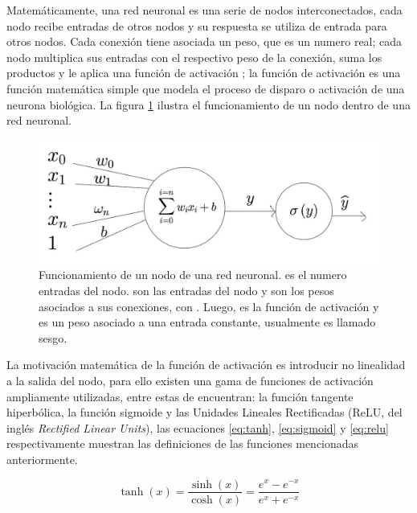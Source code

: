 Matemáticamente, una red neuronal es una serie de nodos interconectados, cada nodo recibe entradas de otros nodos y su respuesta se utiliza de entrada para otros nodos. Cada conexión tiene asociada un peso, que es un numero real; cada nodo multiplica sus entradas con el respectivo peso de la conexión, suma los productos y le aplica una función de activación \cite{Gurney1997}; la función de activación es una función matemática simple que modela el proceso de disparo o activación de una neurona biológica. La figura \ref{fig:nn-single-node} ilustra el funcionamiento de un nodo dentro de una red neuronal.

\begin{figure}[H]
    \centering
    \includegraphics[scale=0.25]{partes/img/perceptron.jpg}
    \caption[Funcionamiento de un nodo de una red neuronal.]{
        Funcionamiento de un nodo de una red neuronal\footnotemark.  es el numero entradas del nodo.  son las entradas del nodo y  son los pesos asociados a sus conexiones, con . Luego, \jim{\sigma} es la función de activación y  es un peso asociado a una entrada constante, usualmente es llamado sesgo.
    } 
    \label{fig:nn-single-node}
\end{figure}

La motivación matemática de la función de activación es introducir no linealidad a la salida del nodo, para ello existen una gama de funciones de activación ampliamente utilizadas, entre estas de encuentran: la función tangente hiperbólica, la función sigmoide y las Unidades Lineales Rectificadas (ReLU, del inglés \textit{Rectified Linear Units}), las ecuaciones \ref{eq:tanh}, \ref{eq:sigmoid} y \ref{eq:relu} respectivamente muestran las definiciones de las funciones mencionadas anteriormente.

\begin{equation}
    \label{eq:tanh}
    \tanh(x) = \frac{\sinh(x)}{\cosh(x)} = \frac{e^x - e^{-x}}{e^x + e^{-x}}
\end{equation}

